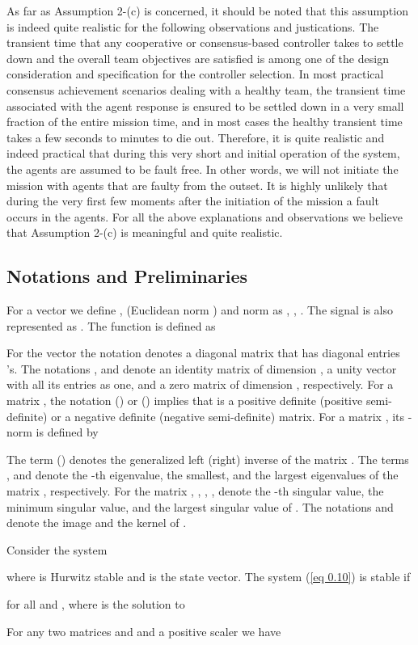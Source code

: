 \documentclass[12pt,draftcls,onecolumn]{IEEEtran}
\begin{document}
 As far as Assumption 2-(c) is concerned, it should be
noted that this assumption is indeed quite realistic for
the following observations and justications. The transient
time that any cooperative or consensus-based controller
takes to settle down and the overall team objectives
are satisfied is among one of the design consideration
and specification for the controller selection. In most
practical consensus achievement scenarios dealing with a healthy team, the transient time associated with the
agent response is ensured to be settled down in a very
small fraction of the entire mission time, and in most
cases the healthy transient time takes a few seconds to
minutes to die out. Therefore, it is quite realistic and
indeed practical that during this very short and initial
operation of the system, the agents are assumed to be
fault free. In other words, we will not initiate the mission
with agents that are faulty from the outset. It is highly
unlikely that during the very first few moments after the
initiation of the mission a fault occurs in the agents. For
all the above explanations and observations we believe
that Assumption 2-(c) is meaningful and quite realistic.
\subsection{Notations and Preliminaries}
For a vector  we define  ,  (Euclidean norm ) and  norm as , , . The signal  is also represented as . The function  is defined as

 For the vector  the notation  denotes a diagonal matrix that has diagonal entries 's. The notations ,  and  denote  an identity matrix of dimension , a unity  vector with all its entries as one, and a zero matrix of dimension , respectively. For a matrix , the notation  () or  () implies that  is a positive definite (positive semi-definite) or a negative definite (negative semi-definite) matrix. For a matrix , its -norm is defined by 
 
  The term  () denotes the generalized left (right) inverse of the matrix . The terms ,  and  denote the -th  eigenvalue, the smallest, and the largest eigenvalues of the matrix , respectively. For the matrix , , , ,  denote the -th  singular value, the minimum singular value, and the largest singular value of . 
The notations  and   denote the image and the kernel of . 
\begin{theorems}\label{theorem 0.3}\cite{Yedavalli14}
Consider the system 

where  is Hurwitz stable and  is the state vector. The system (\ref{eq 0.10}) is stable if 

for all  and , where  is the solution to 

\end{theorems}
\begin{facts}\label{Fact1}
For any two matrices  and  and a positive scaler  we have 

\end{facts}
\end{document}
